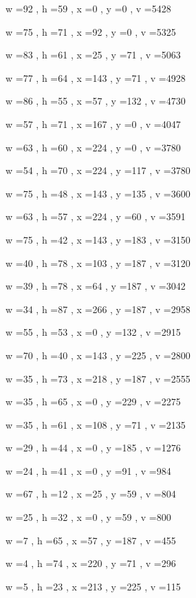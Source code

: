 \documentclass[11pt]{article}
\begin{document}
w =92 , h =59 , x =0 , y =0 , v =5428
\par
w =75 , h =71 , x =92 , y =0 , v =5325
\par
w =83 , h =61 , x =25 , y =71 , v =5063
\par
w =77 , h =64 , x =143 , y =71 , v =4928
\par
w =86 , h =55 , x =57 , y =132 , v =4730
\par
w =57 , h =71 , x =167 , y =0 , v =4047
\par
w =63 , h =60 , x =224 , y =0 , v =3780
\par
w =54 , h =70 , x =224 , y =117 , v =3780
\par
w =75 , h =48 , x =143 , y =135 , v =3600
\par
w =63 , h =57 , x =224 , y =60 , v =3591
\par
w =75 , h =42 , x =143 , y =183 , v =3150
\par
w =40 , h =78 , x =103 , y =187 , v =3120
\par
w =39 , h =78 , x =64 , y =187 , v =3042
\par
w =34 , h =87 , x =266 , y =187 , v =2958
\par
w =55 , h =53 , x =0 , y =132 , v =2915
\par
w =70 , h =40 , x =143 , y =225 , v =2800
\par
w =35 , h =73 , x =218 , y =187 , v =2555
\par
w =35 , h =65 , x =0 , y =229 , v =2275
\par
w =35 , h =61 , x =108 , y =71 , v =2135
\par
w =29 , h =44 , x =0 , y =185 , v =1276
\par
w =24 , h =41 , x =0 , y =91 , v =984
\par
w =67 , h =12 , x =25 , y =59 , v =804
\par
w =25 , h =32 , x =0 , y =59 , v =800
\par
w =7 , h =65 , x =57 , y =187 , v =455
\par
w =4 , h =74 , x =220 , y =71 , v =296
\par
w =5 , h =23 , x =213 , y =225 , v =115
\par
\newpage


\end{document}
